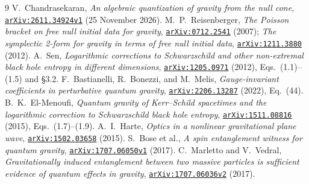 \documentclass[10pt,a4paper]{article}
\newcommand{\arxiv}[2]{\href{https://arxiv.org/abs/#1}{#2}}
\begin{document}
\begingroup
\footnotesize
\renewcommand{\section}[2]{\subsection*{References}}
\renewcommand{\markboth}[2]{}
\begin{thebibliography}{9}\setlength{\itemsep}{1.5pt}\setlength{\parskip}{0pt}
  V.~Chandrasekaran, \textsl{An algebraic quantization of gravity from the null cone},
  \arxiv{2611.34924v1}{\texttt{arXiv:2611.34924v1}} (25 November 2026).
  M.~P.~Reisenberger, \textsl{The Poisson bracket on free null initial data for gravity},
  \arxiv{0712.2541}{\texttt{arXiv:0712.2541}} (2007);
  \textsl{The symplectic 2-form for gravity in terms of free null initial data},
  \arxiv{1211.3880}{\texttt{arXiv:1211.3880}} (2012).
  A.~Sen, \textsl{Logarithmic corrections to Schwarzschild and other non-extremal black hole entropy in different dimensions},
  \arxiv{1205.0971}{\texttt{arXiv:1205.0971}} (2012), Eqs.~(1.1)--(1.5) and \S3.2.
  F.~Bastianelli, R.~Bonezzi, and M.~Melis, \textsl{Gauge-invariant coefficients in perturbative quantum gravity},
  \arxiv{2206.13287}{\texttt{arXiv:2206.13287}} (2022), Eq.~(44).
  B.~K.~El-Menoufi, \textsl{Quantum gravity of Kerr--Schild spacetimes and the logarithmic correction to Schwarzschild black hole entropy},
  \arxiv{1511.08816}{\texttt{arXiv:1511.08816}} (2015), Eqs.~(1.7)--(1.9).
  A.~I.~Harte, \textsl{Optics in a nonlinear gravitational plane wave},
  \arxiv{1502.03658}{\texttt{arXiv:1502.03658}} (2015).
  S.~Bose et al., \textsl{A spin entanglement witness for quantum gravity},
  \arxiv{1707.06050v1}{\texttt{arXiv:1707.06050v1}} (2017).
  C.~Marletto and V.~Vedral, \textsl{Gravitationally induced entanglement between two massive particles is sufficient evidence of quantum effects in gravity},
  \arxiv{1707.06036v2}{\texttt{arXiv:1707.06036v2}} (2017).
\end{thebibliography}
\endgroup
\end{document}

